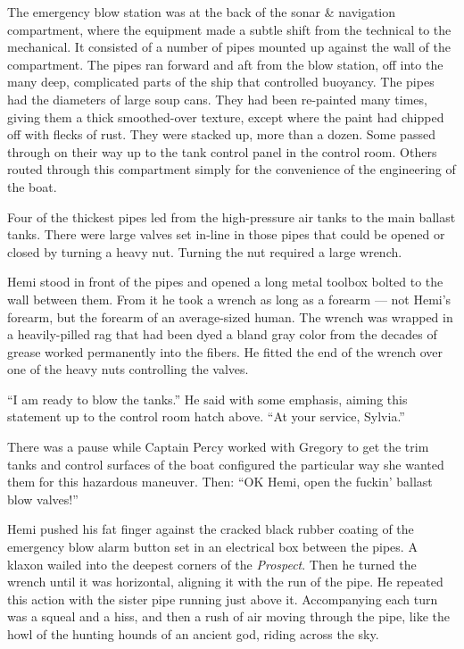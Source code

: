 \documentclass[]{article}
\begin{document}
\begin{multicols}{2}
The emergency blow station was at the back of the sonar \& navigation
compartment, where the equipment made a subtle shift from the technical
to the mechanical. It consisted of a number of pipes mounted up against
the wall of the compartment. The pipes ran forward and aft from the blow
station, off into the many deep, complicated parts of the ship that
controlled buoyancy. The pipes had the diameters of large soup cans.
They had been re-painted many times, giving them a thick smoothed-over
texture, except where the paint had chipped off with flecks of rust.
They were stacked up, more than a dozen. Some passed through on their
way up to the tank control panel in the control room. Others routed
through this compartment simply for the convenience of the engineering
of the boat.

Four of the thickest pipes led from the high-pressure air tanks to the
main ballast tanks. There were large valves set in-line in those pipes
that could be opened or closed by turning a heavy nut. Turning the nut
required a large wrench.

Hemi stood in front of the pipes and opened a long metal toolbox bolted
to the wall between them. From it he took a wrench as long as a forearm
--- not Hemi's forearm, but the forearm of an average-sized human. The
wrench was wrapped in a heavily-pilled rag that had been dyed a bland
gray color from the decades of grease worked permanently into the
fibers. He fitted the end of the wrench over one of the heavy nuts
controlling the valves.

``I am ready to blow the tanks.'' He said with some emphasis, aiming
this statement up to the control room hatch above. ``At your service,
Sylvia.''

There was a pause while Captain Percy worked with Gregory to get the
trim tanks and control surfaces of the boat configured the particular
way she wanted them for this hazardous maneuver. Then: ``OK Hemi, open
the fuckin' ballast blow valves!''

Hemi pushed his fat finger against the cracked black rubber coating of
the emergency blow alarm button set in an electrical box between the
pipes. A klaxon wailed into the deepest corners of the \emph{Prospect}.
Then he turned the wrench until it was horizontal, aligning it with the
run of the pipe. He repeated this action with the sister pipe running
just above it. Accompanying each turn was a squeal and a hiss, and then
a rush of air moving through the pipe, like the howl of the hunting
hounds of an ancient god, riding across the sky.


\end{multicols}
\end{document}
